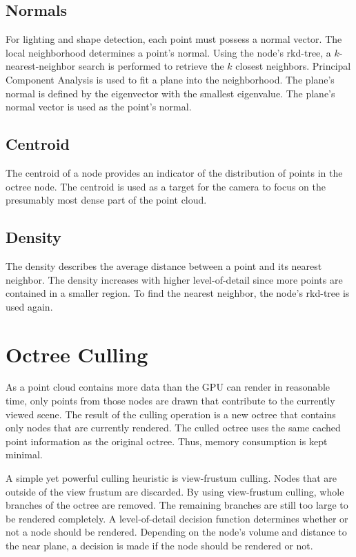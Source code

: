 \subsection{Normals}

For lighting and shape detection, each point must possess a normal vector. The local neighborhood determines a point's normal. Using the node's rkd-tree, a $k$-nearest-neighbor search is performed to retrieve the $k$ closest neighbors. Principal Component Analysis \cite{jolliffe2002principal} is used to fit a plane into the neighborhood. The plane's normal is defined by the eigenvector with the smallest eigenvalue. The plane's normal vector is used as the point's normal.


\subsection{Centroid}

The centroid of a node provides an indicator of the distribution of points in the octree node. The centroid is used as a target for the camera to focus on the presumably most dense part of the point cloud. 


\subsection{Density}

The density describes the average distance between a point and its nearest neighbor. The density increases with higher level-of-detail since more points are contained in a smaller region. To find the nearest neighbor, the node's rkd-tree is used again.


\section{Octree Culling}
\label{sec:octree_culling}

As a point cloud contains more data than the GPU can render in reasonable time, only points from those nodes are drawn that contribute to the currently viewed scene. The result of the culling operation is a new octree that contains only nodes that are currently rendered. The culled octree uses the same cached point information as the original octree. Thus, memory consumption is kept minimal. 

\par

A simple yet powerful culling heuristic is view-frustum culling. Nodes that are outside of the view frustum are discarded. By using view-frustum culling, whole branches of the octree are removed. The remaining branches are still too large to be rendered completely. A level-of-detail decision function determines whether or not a node should be rendered. Depending on the node's volume and distance to the near plane, a decision is made if the node should be rendered or not. 


